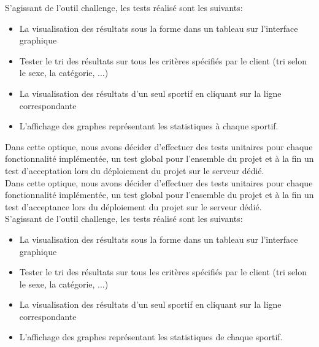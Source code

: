 S'agissant de l'outil challenge, les tests réalisé sont les suivants:
\begin{itemize}
\item La visualisation des résultats sous la forme dans un tableau sur l'interface graphique
\item Tester le tri des résultats sur tous les critères spécifiés par le  client (tri selon le sexe, la catégorie, ...)
\item La visualisation des résultats d'un seul sportif en cliquant sur la ligne correspondante
\item L'affichage des graphes représentant les statistiques à chaque sportif.
\end{itemize}
 
Dans cette optique, nous avons décider d'effectuer des tests unitaires pour chaque fonctionnalité implémentée, un test global pour l'ensemble du projet et à la fin un test d'acceptation lors du déploiement du projet sur le serveur dédié.\\

Dans cette optique, nous avons décider d'effectuer des tests unitaires pour chaque fonctionnalité implémentée, un test global pour l'ensemble du projet et à la fin un test d'acceptance lors du déploiement du projet sur le serveur dédié.\\

S'agissant de l'outil challenge, les tests réalisé sont les suivants:
\begin{itemize}
\item La visualisation des résultats sous la forme dans un tableau sur l'interface graphique
\item Tester le tri des résultats sur tous les critères spécifiés par le  client (tri selon le sexe, la catégorie, ...)
\item La visualisation des résultats d'un seul sportif en cliquant sur la ligne correspondante
\item L'affichage des graphes représentant les statistiques de chaque sportif.
\end{itemize}


